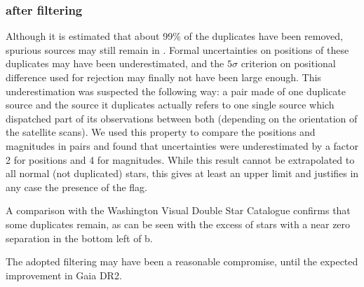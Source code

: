 \subsubsection{{} after filtering}

Although it is estimated that about 99\% of the duplicates have been removed, 
spurious sources may still remain in {}. Formal uncertainties on positions 
of these duplicates may have been underestimated, and the $5\sigma$ criterion 
on positional difference used for rejection may finally not have been large enough. 
This underestimation was suspected the following way: a pair made of one duplicate source and the source
it duplicates actually refers to one single source which dispatched part of its observations
between both (depending on the orientation of the satellite scans). We used this property to
compare the positions and magnitudes in pairs and found that uncertainties were underestimated
by a factor 2 for positions and 4 for magnitudes. While this result cannot be extrapolated
to all normal (not duplicated) stars, this gives at least an upper limit and justifies in any
case the presence of the  flag.

A comparison with the Washington Visual Double Star Catalogue \citep[WDS,][]{WDS}
confirms that some duplicates remain, as can be seen with the excess of stars with a near 
zero separation in the bottom left of b.

The adopted filtering
may  have been a reasonable compromise, until the expected improvement
in Gaia DR2.




%
%

